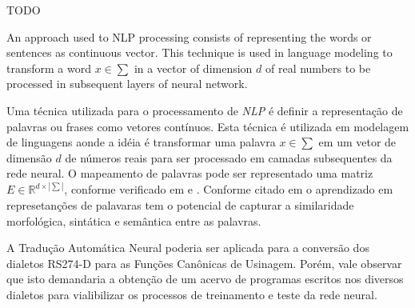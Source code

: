 \documentclass[a4paper]{article}
\begin{document}
    TODO

    An approach used to NLP processing consists of representing the words 
    or sentences as continuous vector. This technique is used in language 
    modeling to transform a word $x \in \sum$ in a vector of dimension 
    $d$ of real numbers to be processed in subsequent layers of neural network.

    
    Uma t\'ecnica utilizada para o processamento de \emph{NLP} \'e definir a representa\c c\~ao 
    de palavras ou frases como vetores cont\'inuos. Esta t\'ecnica \'e utilizada em modelagem de 
    linguagens aonde a id\'eia \'e transformar uma palavra $x \in \sum$ em um vetor de dimens\~ao 
    $d$ de n\'umeros reais para ser processado em camadas subsequentes da rede neural.
    O mapeamento de palavras pode ser representado uma matriz $E \in \mathbb{R} ^{d \times |\sum|}$,
    conforme verificado em \cite{collobert:2008} e \cite{stahlberg:2020}.
    Conforme citado em \cite{stahlberg:2020} o aprendizado em represetan\c c\~oes de palavaras
    tem o potencial de capturar a similaridade morfol\'ogica, sint\'atica e sem\^antica entre as 
    palavras.
    
    A Tradução Automática Neural poderia ser aplicada para a conversão dos dialetos RS274-D 
    para as Funções Canônicas de Usinagem. Porém, vale observar que isto demandaria a obtenção de 
    um acervo de programas escritos nos diversos dialetos para vialibilizar os processos de 
    treinamento e teste da rede neural.


 
\end{document}
